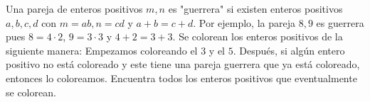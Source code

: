 Una pareja de enteros positivos $m, n$ es "guerrera" si existen enteros positivos $a, b, c, d$ con
$m = ab, n = cd$ y $a + b = c + d$. Por ejemplo, la pareja $8, 9$ es guerrera pues $8 = 4 \cdot 2$,
$9 = 3 \cdot 3$ y $4 + 2 = 3 + 3$. Se colorean los enteros positivos de la siguiente manera:
Empezamos coloreando el $3$ y el $5$.
Después, si algún entero positivo no está coloreado y este tiene una pareja guerrera
que ya está coloreado, entonces lo coloreamos.
Encuentra todos los enteros positivos que eventualmente se colorean.